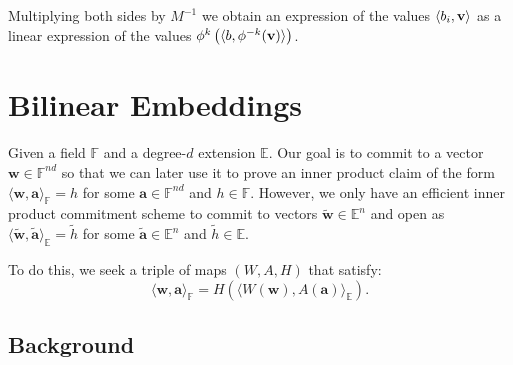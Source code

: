 \documentclass[11pt,letterpaper,usenames,dvipsnames]{article}
\begin{document}
Multiplying both sides by $M^{-1}$ we obtain an expression of the values $\langle b_i, \mathbf{v}\rangle$ as a linear expression of the values $\phi^{k} \left(\langle b, \phi^{-k}(\mathbf{v})\rangle\right)$.






\section{Bilinear Embeddings}

Given a field $\mathbb F$ and a degree-$d$ extension $\mathbb E$. Our goal is to commit to a vector $\mathbf{w} \in \mathbb{F}^{n d}$ so that we can later use it to prove an inner product claim of the form $\langle \mathbf{w}, \mathbf{a}\rangle_\mathbb{F} = h$ for some $\mathbf{a} \in \mathbb{F}^{n d}$ and $h \in \mathbb{F}$. However, we only have an efficient inner product commitment scheme to commit to vectors $\widetilde{\mathbf{w}} \in \mathbb{E}^{n}$ and open as $\langle \widetilde{\mathbf{w}}, \widetilde{\mathbf{a}}\rangle_\mathbb{E} = \widetilde{h}$ for some $\widetilde{\mathbf{a}} \in \mathbb{E}^{n}$ and $\widetilde{h} \in \mathbb{E}$.

To do this, we seek a triple of maps $(W, A, H)$ that satisfy:
\[
\langle \mathbf{w},\mathbf{a}\rangle_{\mathbb{F}}
=
H\left(\langle W(\mathbf{w}), A(\mathbf{a}) \rangle_{\mathbb{E}} \right).
\]

\subsection{Background}
\end{document}
